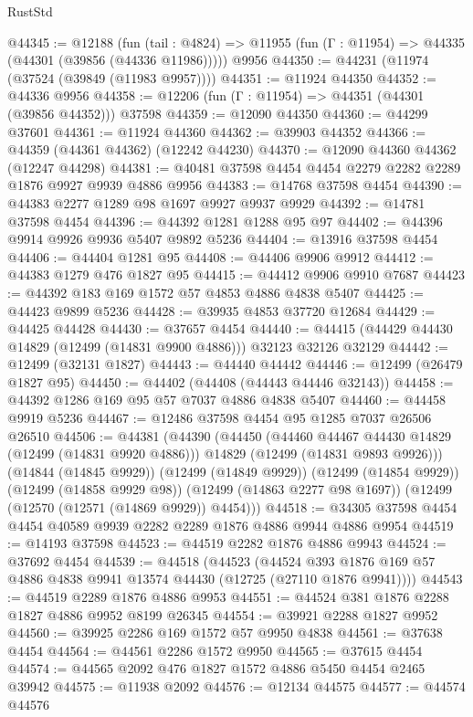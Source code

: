 \begin{lexlean}{RustStd}
\begin{coremodule}
@44345 := @12188
    (fun (tail : @4824) => @11955 (fun (Γ : @11954) => @44335 (@44301 (@39856 (@44336 @11986)))))
    @9956
@44350 := @44231 (@11974 (@37524 (@39849 (@11983 @9957))))
@44351 := @11924 @44350
@44352 := @44336 @9956
@44358 := @12206 (fun (Γ : @11954) => @44351 (@44301 (@39856 @44352))) @37598
@44359 := @12090 @44350
@44360 := @44299 @37601
@44361 := @11924 @44360
@44362 := @39903 @44352
@44366 := @44359 (@44361 @44362) (@12242 @44230)
@44370 := @12090 @44360 @44362 (@12247 @44298)
@44381 := @40481 @37598 @4454 @4454 @2279 @2282 @2289 @1876 @9927 @9939 @4886 @9956
@44383 := @14768 @37598 @4454
@44390 := @44383 @2277 @1289 @98 @1697 @9927 @9937 @9929
@44392 := @14781 @37598 @4454
@44396 := @44392 @1281 @1288 @95 @97
@44402 := @44396 @9914 @9926 @9936 @5407 @9892 @5236
@44404 := @13916 @37598 @4454
@44406 := @44404 @1281 @95
@44408 := @44406 @9906 @9912
@44412 := @44383 @1279 @476 @1827 @95
@44415 := @44412 @9906 @9910 @7687
@44423 := @44392 @183 @169 @1572 @57 @4853 @4886 @4838 @5407
@44425 := @44423 @9899 @5236
@44428 := @39935 @4853 @37720 @12684
@44429 := @44425 @44428
@44430 := @37657 @4454
@44440 := @44415 (@44429 @44430 @14829 (@12499 (@14831 @9900 @4886))) @32123 @32126 @32129
@44442 := @12499 (@32131 @1827)
@44443 := @44440 @44442
@44446 := @12499 (@26479 @1827 @95)
@44450 := @44402 (@44408 (@44443 @44446 @32143))
@44458 := @44392 @1286 @169 @95 @57 @7037 @4886 @4838 @5407
@44460 := @44458 @9919 @5236
@44467 := @12486 @37598 @4454 @95 @1285 @7037 @26506 @26510
@44506 := @44381
    (@44390
      (@44450
        (@44460 @44467 @44430 @14829 (@12499 (@14831 @9920 @4886)))
        @14829
        (@12499 (@14831 @9893 @9926)))
      (@14844 (@14845 @9929))
      (@12499 (@14849 @9929))
      (@12499 (@14854 @9929))
      (@12499 (@14858 @9929 @98))
      (@12499 (@14863 @2277 @98 @1697))
      (@12499 (@12570 (@12571 (@14869 @9929)) @4454)))
@44518 := @34305 @37598 @4454 @4454 @40589 @9939 @2282 @2289 @1876 @4886 @9944 @4886 @9954
@44519 := @14193 @37598
@44523 := @44519 @2282 @1876 @4886 @9943
@44524 := @37692 @4454
@44539 := @44518
    (@44523
      (@44524 @393 @1876 @169 @57 @4886 @4838 @9941 @13574 @44430 (@12725 (@27110 @1876 @9941))))
@44543 := @44519 @2289 @1876 @4886 @9953
@44551 := @44524 @381 @1876 @2288 @1827 @4886 @9952 @8199 @26345
@44554 := @39921 @2288 @1827 @9952
@44560 := @39925 @2286 @169 @1572 @57 @9950 @4838
@44561 := @37638 @4454
@44564 := @44561 @2286 @1572 @9950
@44565 := @37615 @4454
@44574 := @44565 @2092 @476 @1827 @1572 @4886 @5450 @4454 @2465 @39942
@44575 := @11938 @2092
@44576 := @12134 @44575
@44577 := @44574 @44576

\end{coremodule}
\end{lexlean}
